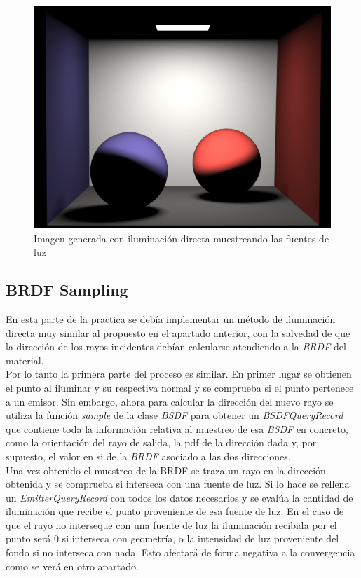 \documentclass[10pt,oneside,a4paper]{article}
\begin{document}
\begin{figure}[h]
\centering
\includegraphics[width=.6\linewidth]{images/cbox_direct_ems_diff_512.png}
\caption{Imagen generada con iluminación directa muestreando las fuentes de luz}
\label{fig:disp}
\end{figure} 
\subsection{BRDF Sampling}
En esta parte de la practica se debía implementar un método de iluminación directa muy similar al propuesto en el apartado anterior, con la salvedad de que la dirección de los rayos incidentes debían calcularse atendiendo a la \textit{BRDF} del material.\\

Por lo tanto la primera parte del proceso es similar. En primer lugar se obtienen el punto al iluminar y su respectiva normal y se comprueba si el punto pertenece a un emisor. Sin embargo, ahora para calcular la dirección del nuevo rayo se utiliza la función \textit{sample} de la clase \textit{BSDF} para obtener un \textit{BSDFQueryRecord} que contiene toda la información relativa al muestreo de esa \textit{BSDF} en concreto, como la orientación del rayo de salida, la pdf de la dirección dada y, por supuesto, el valor en si de la \textit{BRDF} asociado a las dos direcciones.\\

Una vez obtenido el muestreo de la BRDF se traza un rayo en la dirección obtenida y se comprueba si interseca con una fuente de luz. Si lo hace se rellena un \textit{EmitterQueryRecord} con todos los datos necesarios y se evalúa la cantidad de iluminación que recibe el punto proveniente de esa fuente de luz. En el caso de que el rayo no interseque con una fuente de luz la iluminación recibida por el punto será 0 si interseca con geometría, o la intensidad de luz proveniente del fondo si no interseca con nada. Esto afectará de forma negativa a la convergencia como se verá en otro apartado.\\
\end{document}
